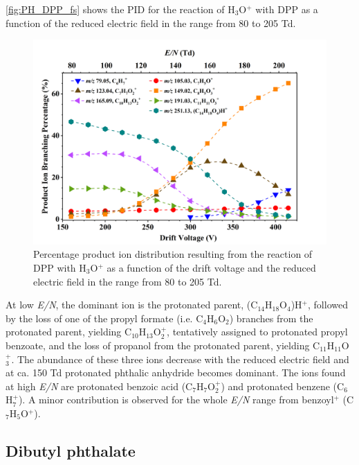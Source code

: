 \autoref{fig:PH_DPP_fs} shows the PID for the reaction of H$_3$O$^+$ with DPP as a function of the reduced electric field in the range from 80 to 205 Td.
%
    \begin{figure}[htb]%
    \centering
    \includegraphics[height=0.4\textheight]{pics/DPP-BR.png}
    \caption{Percentage product ion distribution resulting from the reaction of DPP with H$_3$O$^+$ as a function of the drift voltage and the reduced electric field in the range from 80 to 205 Td.}
    \label{fig:PH_DPP_fs}
    \end{figure}
%
At low \textit{E/N}, the dominant ion is the protonated parent, (C$_{14}$H$_{18}$O$_4$)H$^+$, followed by the  loss of one of the propyl formate (i.e. C$_4$H$_6$O$_2$) branches from the protonated parent, yielding C$_{10}$H$_{13}$O$_2^+$, tentatively assigned to protonated propyl benzoate, and the loss of propanol from the protonated parent, yielding C$_{11}$H$_{11}$O$_3^+$. 
%
The abundance of these three ions decrease with the reduced electric field and at ca. 150 Td protonated phthalic anhydride becomes dominant.
%
The ions found at high \textit{E/N} are protonated benzoic acid (C$_{7}$H$_{7}$O$_2^+$) and  protonated benzene (C$_6$H$_{7}^+$).
A minor contribution is observed for the whole \textit{E/N} range from benzoyl$^+$ (C$_7$H$_{5}$O$^+$).






\subsection{Dibutyl phthalate}

